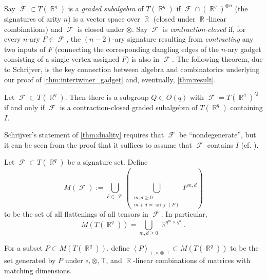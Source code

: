 \documentclass{theoretics}
\DeclareMathOperator{\rr}{\mathbb{R}}
\DeclareMathOperator{\arity}{arity}
\DeclareMathOperator{\fc}{\mathcal{F}}
\newcommand{\tcwd}[1]{\left\langle #1 \right\rangle_{+, \circ, \otimes ,\top}}
\begin{document}
Say $\fc \subset T(\rr^q)$ is a \emph{graded subalgebra} of $T(\rr^q)$ if 
$\fc \cap (\rr^q)^{\otimes n}$ (the signatures of arity $n$) 
is a vector space over $\rr$ (closed under $\rr$-linear combinations) and
$\fc$ is closed under $\otimes$.
Say $\fc$ is \emph{contraction-closed} if, for every $n$-ary $F \in \fc$,
the $(n-2)$-ary signature resulting from \emph{contracting} any two inputs of $F$ 
(connecting the corresponding dangling edges of the $n$-ary gadget consisting of a single vertex
assigned $F$) is also in $\fc$.
The following theorem, due to Schrijver, is the key connection between
algebra and combinatorics underlying
our proof of \autoref{thm:intertwiner_gadget} and, eventually, \autoref{thm:result}.
\begin{theorem}
    Let $\fc \subset T(\rr^q)$. Then there is a subgroup $Q \subset O(q)$ with $\fc = T(\rr^q)^Q$
    if and only if $\fc$ is a contraction-closed graded subalgebra of $T(\rr^q)$ containing $I$.
    \label{thm:duality}
\end{theorem}
Schrijver's statement of \autoref{thm:duality} requires that
$\fc$ be ``nondegenerate'', but it can be seen from the proof that
it suffices to assume that $\fc$ contains $I$ (cf. \cite[Theorem 4]{regts_rank_2012}).

\begin{definition}[$M(\fc),M(T(\rr^q))$]
    Let $\fc \subset T(\rr^q)$ be a signature set. Define 
    \[
        M(\fc) := \bigcup_{F \in \fc}\left(\bigcup_{\substack{m,d \geq 0 \\ m+d=\arity(F)}} 
        F^{m,d}\right)
    \]
    to be the set of all flattenings of all tensors in $\fc$. In particular,
    \[
        M(T(\rr^q)) = \bigcup_{m,d \geq 0} \rr^{q^m\times q^d}.
    \]
\end{definition}
For a subset $P \subset M(T(\rr^q))$, define $\tcwd{P} \subset M(T(\rr^q))$ to be the set generated
by $P$ under $\circ, \otimes, \top$, and $\rr$-linear combinations of matrices with matching
dimensions.
\end{document}
